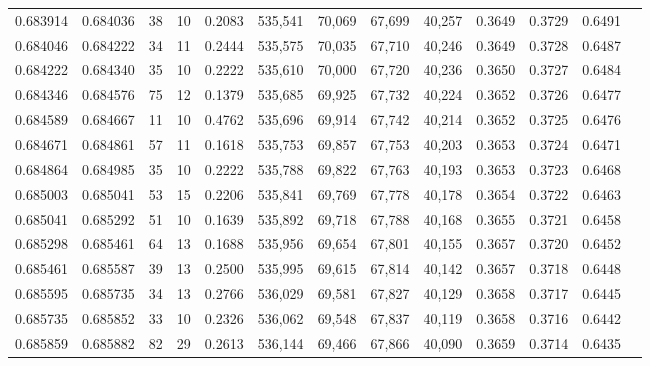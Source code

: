 \begin{tabular}{rrrrrrrrrrrrr}
0.683914 & 0.684036 &    38 &  10 &                                     0.2083 & 535,541 &  70,069 &  67,699 &  40,257 & 0.3649 & 0.3729 & 0.6491 \\
0.684046 & 0.684222 &    34 &  11 &                                     0.2444 & 535,575 &  70,035 &  67,710 &  40,246 & 0.3649 & 0.3728 & 0.6487 \\
0.684222 & 0.684340 &    35 &  10 &                                     0.2222 & 535,610 &  70,000 &  67,720 &  40,236 & 0.3650 & 0.3727 & 0.6484 \\
0.684346 & 0.684576 &    75 &  12 &                                     0.1379 & 535,685 &  69,925 &  67,732 &  40,224 & 0.3652 & 0.3726 & 0.6477 \\
0.684589 & 0.684667 &    11 &  10 &                                     0.4762 & 535,696 &  69,914 &  67,742 &  40,214 & 0.3652 & 0.3725 & 0.6476 \\
0.684671 & 0.684861 &    57 &  11 &                                     0.1618 & 535,753 &  69,857 &  67,753 &  40,203 & 0.3653 & 0.3724 & 0.6471 \\
0.684864 & 0.684985 &    35 &  10 &                                     0.2222 & 535,788 &  69,822 &  67,763 &  40,193 & 0.3653 & 0.3723 & 0.6468 \\
0.685003 & 0.685041 &    53 &  15 &                                     0.2206 & 535,841 &  69,769 &  67,778 &  40,178 & 0.3654 & 0.3722 & 0.6463 \\
0.685041 & 0.685292 &    51 &  10 &                                     0.1639 & 535,892 &  69,718 &  67,788 &  40,168 & 0.3655 & 0.3721 & 0.6458 \\
0.685298 & 0.685461 &    64 &  13 &                                     0.1688 & 535,956 &  69,654 &  67,801 &  40,155 & 0.3657 & 0.3720 & 0.6452 \\
0.685461 & 0.685587 &    39 &  13 &                                     0.2500 & 535,995 &  69,615 &  67,814 &  40,142 & 0.3657 & 0.3718 & 0.6448 \\
0.685595 & 0.685735 &    34 &  13 &                                     0.2766 & 536,029 &  69,581 &  67,827 &  40,129 & 0.3658 & 0.3717 & 0.6445 \\
0.685735 & 0.685852 &    33 &  10 &                                     0.2326 & 536,062 &  69,548 &  67,837 &  40,119 & 0.3658 & 0.3716 & 0.6442 \\
0.685859 & 0.685882 &    82 &  29 &                                     0.2613 & 536,144 &  69,466 &  67,866 &  40,090 & 0.3659 & 0.3714 & 0.6435 \\

\end{tabular}
